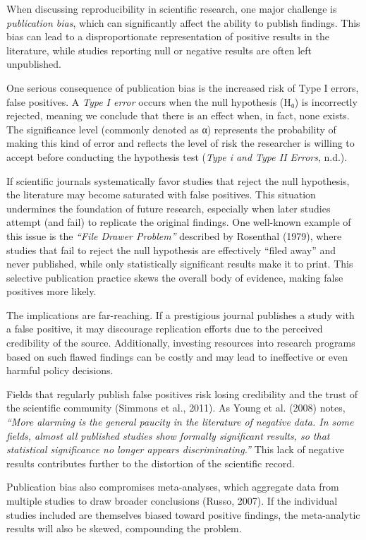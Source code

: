 \documentclass[
  british,
  a4paper,
]{article}
\begin{document}
When discussing reproducibility in scientific research, one major
challenge is \emph{publication bias}, which can significantly affect the
ability to publish findings. This bias can lead to a disproportionate
representation of positive results in the literature, while studies
reporting null or negative results are often left unpublished.

One serious consequence of publication bias is the increased risk of
Type I errors, false positives. A \emph{Type I error} occurs when the
null hypothesis (H₀) is incorrectly rejected, meaning we conclude that
there is an effect when, in fact, none exists. The significance level
(commonly denoted as α) represents the probability of making this kind
of error and reflects the level of risk the researcher is willing to
accept before conducting the hypothesis test (\emph{Type i and Type II
Errors}, n.d.).

If scientific journals systematically favor studies that reject the null
hypothesis, the literature may become saturated with false positives.
This situation undermines the foundation of future research, especially
when later studies attempt (and fail) to replicate the original
findings. One well-known example of this issue is the \emph{``File
Drawer Problem''} described by Rosenthal (1979), where studies that fail
to reject the null hypothesis are effectively ``filed away'' and never
published, while only statistically significant results make it to
print. This selective publication practice skews the overall body of
evidence, making false positives more likely.

The implications are far-reaching. If a prestigious journal publishes a
study with a false positive, it may discourage replication efforts due
to the perceived credibility of the source. Additionally, investing
resources into research programs based on such flawed findings can be
costly and may lead to ineffective or even harmful policy decisions.

Fields that regularly publish false positives risk losing credibility
and the trust of the scientific community (Simmons et al., 2011). As
Young et al. (2008) notes, \emph{``More alarming is the general paucity
in the literature of negative data. In some fields, almost all published
studies show formally significant results, so that statistical
significance no longer appears discriminating.''} This lack of negative
results contributes further to the distortion of the scientific record.

Publication bias also compromises meta-analyses, which aggregate data
from multiple studies to draw broader conclusions (Russo, 2007). If the
individual studies included are themselves biased toward positive
findings, the meta-analytic results will also be skewed, compounding the
problem.
\end{document}
